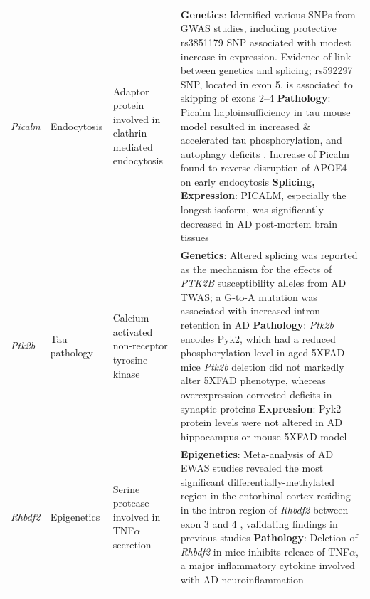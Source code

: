 \begin{changemargin}{1.5cm}
\begin{landscape}
\begin{longtable}[c]{p{1cm}p{2cm}p{4cm}p{19cm}}
			\centering \textit{Picalm} &
			\centering Endocytosis  &
			\centering Adaptor protein involved in clathrin-mediated endocytosis &	
			\tabitem \textbf{Genetics}: Identified various SNPs from GWAS studies, including protective rs3851179 SNP associated with modest increase in expression. Evidence of link between genetics and splicing; rs592297 SNP, located in exon 5, is associated to skipping of exons 2–4\cite{Parikh2014} \newline
			\tabitem \textbf{Pathology}: Picalm haploinsufficiency in tau mouse model resulted in increased \& accelerated tau phosphorylation, and autophagy deficits \cite{Ando2020}. Increase of Picalm found to reverse disruption of APOE4 on early endocytosis  \cite{Narayan2020} \newline
			\tabitem \textbf{Splicing, Expression}: PICALM, especially the longest isoform, was significantly decreased in AD post-mortem brain tissues \cite{Ando2016} \\
			\hdashline[0.5pt/5pt]
			
			\centering \textit{Ptk2b} &
			\centering Tau pathology  &
			\centering Calcium-activated non-receptor tyrosine kinase &			
			\tabitem \textbf{Genetics}: Altered splicing was reported as the mechanism for the effects of \textit{PTK2B} susceptibility alleles from AD TWAS; a G-to-A mutation was associated with increased intron retention in AD \cite{Raj2018}  \newline
			\tabitem \textbf{Pathology}: \textit{Ptk2b} encodes Pyk2, which had a reduced phosphorylation level in aged 5XFAD mice\newline 
			\tabitem \textit{Ptk2b} deletion did not markedly alter 5XFAD phenotype, whereas overexpression corrected deficits in synaptic proteins\newline
			\tabitem \textbf{Expression}: Pyk2 protein levels were not altered in AD hippocampus or mouse 5XFAD model\cite{Giralt2018}\\
			\hdashline[0.5pt/5pt]					
		
			\centering \textit{Rhbdf2} &
			\centering Epigenetics  &
			\centering Serine protease involved in TNF$\alpha$ secretion &
			\tabitem \textbf{Epigenetics}: Meta-analysis of AD EWAS studies revealed the most significant differentially-methylated region in the entorhinal cortex residing in the intron region of \textit{Rhbdf2} between exon 3 and 4 \cite{Smith2021}, validating findings in previous studies\cite{DeJager2014, Lardenoije2019}\newline
			\tabitem \textbf{Pathology}: Deletion of \textit{Rhbdf2} in mice inhibits releace of TNF$\alpha$, a major inflammatory cytokine involved with AD neuroinflammation\cite{Levy2020}\\
			\hdashline[0.5pt/5pt]
			

\end{longtable}
\end{landscape}
\end{changemargin}
